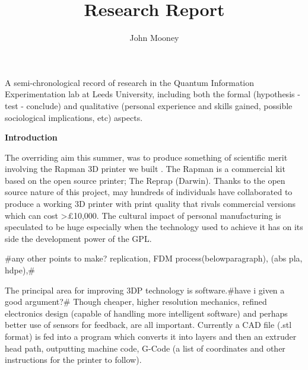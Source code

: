 \documentclass{letter}
\newcommand{\section}[1]{\medskip\bigskip

\noindent\textbf{\LARGE #1}}
\newenvironment{tmparmod}[3]{\begin{list}{}{\setlength{\topsep}{0pt}\setlength{\leftmargin}{#1}\setlength{\rightmargin}{#2}\setlength{\parindent}{#3}\setlength{\listparindent}{\parindent}\setlength{\itemindent}{\parindent}\setlength{\parsep}{\parskip}} \item[]}{\end{list}}
\begin{document}
\title{Research Report}\author{John Mooney}\maketitle

\begin{center}
  \begin{tmparmod}{0pt}{0pt}{1em}
    \begin{tmparmod}{0pt}{2cm}{0pt}
      \begin{tmparmod}{2cm}{0pt}{0pt}
        A semi-chronological record of research in the Quantum Information
        Experimentation lab at Leeds University, including both the formal
        (hypothesis - test - conclude) and qualitative (personal experience
        and skills gained, possible sociological implications, etc) aspects. 
      \end{tmparmod}
    \end{tmparmod}
  \end{tmparmod}
\end{center}





{\tableofcontents}

{\newpage}

\section{Introduction}

The overriding aim this summer, was to produce something of scientific merit
involving the Rapman 3D printer we built . The Rapman is a commercial kit
based on the open source printer; The Reprap (Darwin). Thanks to the open
source nature of this project, may hundreds of individuals have collaborated
to produce a working 3D printer with print quality that rivals commercial
versions which can cost >{\pounds}10,000. The cultural impact of personal
manufacturing is speculated to be huge  especially when the technology used to
achieve it has on its side the development power of the GPL{\nobreak}.

\#any other points to make? replication, FDM process(belowparagraph), (abs
pla, hdpe),\#

The principal area for improving 3DP technology is software.\#have i given a
good argument?\# Though cheaper, higher resolution mechanics, refined
electronics design (capable of handling more intelligent software) and perhaps
better use of sensors for feedback, are all important. Currently a CAD file
(.stl format) is fed into a program which converts it into layers and then an
extruder head path, outputting machine code, G-Code (a list of coordinates and
other instructions for the printer to follow).
\end{document}
